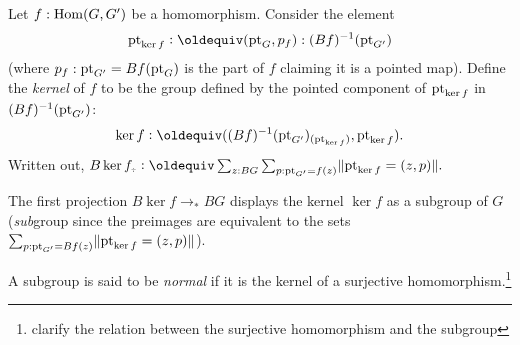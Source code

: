 \begin{definition}
  \label{def:kernel}
Let $f:\mathrm{Hom}(G,G')$  be a homomorphism.
Consider the element 
$$\pt_{\ker f}\defequi(\pt_G,p_f):(Bf)^{-1}(\pt_{G'})$$ (where $p_f:\mathrm{pt}_{G'}=Bf(\mathrm{pt}_G)$ is the part of $f$ claiming it is a pointed map). 
Define the \emph{kernel}  of $f$ to be the group defined by the pointed component  of $\mathrm{pt}_{\ker f}$ in $(Bf)^{-1}(\mathrm{pt}_{G'})$:
$$\ker f\defequi ((Bf)^{-1}(\pt_{G'})_{(\pt_{\ker f})},\pt_{\ker f}).
$$ 
Written out,
$B\ker f_\div\defequi \sum_{z:BG}\sum_{p:\pt_{G'}=f(z)}\Trunc{\pt_{\ker f}=(z,p)}.$  

The first projection $B\ker f\to_* BG$ displays the kernel $\ker f$ as a subgroup of $G$ (\emph{sub}group since the preimages are equivalent to the sets $\sum_{p:\mathrm{pt}_{G'}=Bf(z)}\lVert\mathrm{pt}_{\ker f}=(z,p)\rVert$).  

A subgroup is said to be \emph{normal} if it is the kernel of a surjective homomorphism.\footnote{clarify the relation between the surjective homomorphism and the subgroup}
\end{definition}

